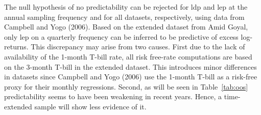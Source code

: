 \documentclass{article}
\begin{document}
\begin{table}[ht]
\begin{threeparttable}
\begin{tablenotes}
\end{tablenotes}
\end{threeparttable}
\end{table}

The null hypothesis of no predictability can be rejected for ldp and lep at the annual sampling frequency and for all datasets, respectively, using data from Campbell and Yogo (2006). Based on the extended dataset from Amid Goyal, only lep on a quarterly frequency can be inferred to be predictive of excess log-returns. This discrepancy may arise from two causes. First due to the lack of availability of the 1-month T-bill rate, all risk free-rate computations are based on the 3-month T-bill in the extended dataset. This introduces minor differences in datasets since Campbell and Yogo (2006) use the 1-month T-bill as a risk-free proxy for their monthly regressions. Second, as will be seen in Table~\vref{tab:oos} predictability seems to have been weakening in recent years. Hence, a time-extended sample will show less evidence of it.  
\end{document}
